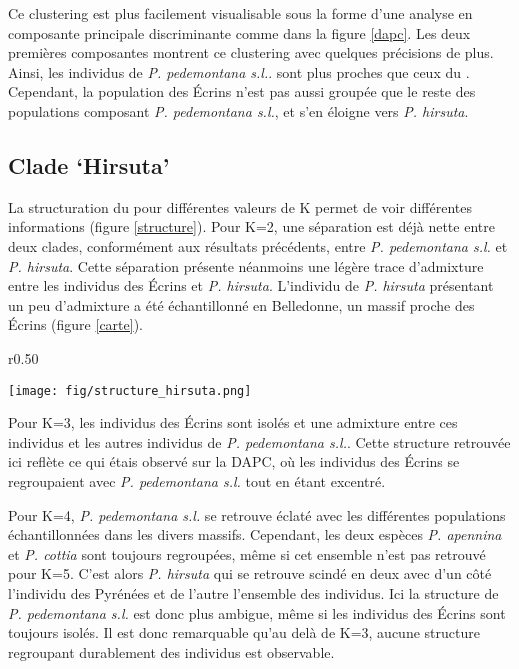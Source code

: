Ce clustering est plus facilement visualisable sous la forme d'une analyse en composante principale discriminante comme dans la figure \ref{dapc}. Les deux premières composantes montrent ce clustering avec quelques précisions de plus. Ainsi, les individus de \textit{P. pedemontana s.l.}. sont plus proches que ceux du . Cependant, la population des Écrins n'est pas aussi groupée que le reste des populations composant \textit{P. pedemontana s.l.}, et s'en éloigne vers \textit{P. hirsuta}.

\subsection{Clade `Hirsuta'}

La structuration du  pour différentes valeurs de K permet de voir différentes informations (figure \ref{structure}). Pour K=2, une séparation est déjà nette entre deux clades, conformément aux résultats précédents, entre \textit{P. pedemontana s.l.} et \textit{P. hirsuta}. Cette séparation présente néanmoins une légère trace d'admixture entre les individus des Écrins et \textit{P. hirsuta}. L'individu de \textit{P. hirsuta} présentant un peu d'admixture a été échantillonné en Belledonne, un massif proche des Écrins (figure \ref{carte}).

\begin{wrapfigure}{r}{0.50\textwidth}
	\vspace{-40pt}
	\begin{center}
	\texttt{[image: fig/structure\_hirsuta.png]}
	\end{center}
	\caption{\textbf{Structuration du  par sNMF.} Les K choisis vont de 2 à 5, avec 20 répétition par K et choix du meilleur run sur critère de cross-entropy.}
    \label{structure}
    \vspace{-20pt}
\end{wrapfigure}


Pour K=3, les individus des Écrins sont isolés et une admixture entre ces individus et les autres individus de \textit{P. pedemontana s.l.}. Cette structure retrouvée ici reflète ce qui étais observé sur la DAPC, où les individus des Écrins se regroupaient avec \textit{P. pedemontana s.l.} tout en étant excentré.

Pour K=4, \textit{P. pedemontana s.l.} se retrouve éclaté avec les différentes populations échantillonnées dans les divers massifs. Cependant, les deux espèces \textit{P. apennina} et \textit{P. cottia} sont toujours regroupées, même si cet ensemble n'est pas retrouvé pour K=5. C'est alors \textit{P. hirsuta} qui se retrouve scindé en deux avec d'un côté l'individu des Pyrénées et de l'autre l'ensemble des individus. Ici la structure de \textit{P. pedemontana s.l.} est donc plus ambigue, même si les individus des Écrins sont toujours isolés. Il est donc remarquable qu'au delà de K=3, aucune structure regroupant durablement des individus est observable.

